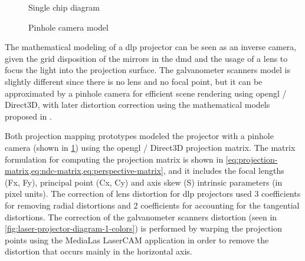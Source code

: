 \begin{figure}[H]
	\begin{floatrow}[2]
		{\caption[Single chip  diagram]{Single chip  diagram\protect\footnotemark}\label{fig:dlp-projector-diagram-dmd}}
		{\caption[Pinhole camera model]{Pinhole camera model\protect\footnotemark}\label{fig:camera-intrinsics}}
	\end{floatrow}
\end{figure}


The mathematical modeling of a \gls{dlp} projector can be seen as an inverse camera, given the grid disposition of the mirrors in the \gls{dmd} and the usage of a lens to focus the light into the projection surface. The galvanometer scanners model is slightly different since there is no lens and no focal point, but it can be approximated by a pinhole camera for efficient scene rendering using \gls{opengl} / Direct3D, with later distortion correction using the mathematical models proposed in \cite{Manakov2011}.

Both projection mapping prototypes modeled the projector with a pinhole camera \cite{Hartley2003} (shown in \cref{fig:camera-intrinsics}) using the \gls{opengl} / Direct3D projection matrix. The matrix formulation for computing the projection matrix is shown in \cref{eq:projection-matrix,eq:ndc-matrix,eq:perspective-matrix}, and it includes the focal lengths (Fx, Fy), principal point (Cx, Cy) and axis skew (S) intrinsic parameters (in pixel units). The correction of lens distortion for \gls{dlp} projectors used 3 coefficients for removing radial distortions and 2 coefficients for accounting for the tangential distortions. The correction of the galvanometer scanners distortion (seen in \cref{fig:laser-projector-diagram-1-colors}) is performed by warping the projection points using the MediaLas LaserCAM application in order to remove the distortion that occurs mainly in the horizontal axis.

